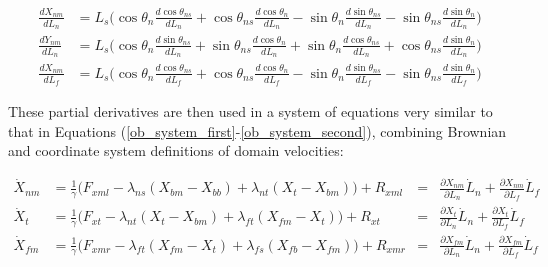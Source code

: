 \documentclass[
11pt, %
english, %
singlespacing, %
headsepline, %
chapterinoneline, %
]{MastersDoctoralThesis} %
\begin{document}
\begin{align}
  \frac{dX_{nm}}{dL_n} &= L_s\Big(\cos\theta_n\frac{d\cos\theta_{ns}}{dL_n} + \cos\theta_{ns}\frac{d\cos\theta_{n}}{dL_n} - \sin\theta_n\frac{d\sin\theta_{ns}}{dL_n} - \sin\theta_{ns}\frac{d\sin\theta_{n}}{dL_n}\Big)\\
  \frac{dY_{nm}}{dL_n} &= L_s\Big(\cos\theta_n\frac{d\sin\theta_{ns}}{dL_n} + \sin\theta_{ns}\frac{d\cos\theta_{n}}{dL_n} + \sin\theta_n\frac{d\cos\theta_{ns}}{dL_n} + \cos\theta_{ns}\frac{d\sin\theta_{n}}{dL_n} \Big)\\
  \frac{dX_{nm}}{dL_f} &= L_s\Big(\cos\theta_n\frac{d\cos\theta_{ns}}{dL_f} + \cos\theta_{ns}\frac{d\cos\theta_{n}}{dL_f} - \sin\theta_n\frac{d\sin\theta_{ns}}{dL_f} - \sin\theta_{ns}\frac{d\sin\theta_{n}}{dL_f} \Big)
\end{align}

These partial derivatives are then used in a system of equations very similar to that in Equations (\ref{ob_system_first}-\ref{ob_system_second}), combining Brownian and coordinate system definitions of domain velocities:

\begin{align}
  \dot{X}_{nm} &= \frac{1}{\gamma} \Big(F_{xml} - \lambda_{ns}(X_{bm} - X_{bb})
  + \lambda_{nt}(X_{t } - X_{bm}) \Big) + R_{xml}
  &=& \frac{\partial X_{nm}}{\partial L_n}\dot{L}_n + \frac{\partial X_{nm}}{\partial L_f}\dot{L}_f\\
  \dot{X}_{t } &= \frac{1}{\gamma} \Big(F_{xt } - \lambda_{nt}(X_{t } - X_{bm})
  + \lambda_{ft}(X_{fm} - X_{t }) \Big) + R_{xt }
  &=& \frac{\partial X_{t}}{\partial L_n}\dot{L}_n + \frac{\partial X_{t}}{\partial L_f}\dot{L}_f\\
  \dot{X}_{fm} &= \frac{1}{\gamma} \Big(F_{xmr} - \lambda_{ft}(X_{fm} - X_{t })
  + \lambda_{fs}(X_{fb} - X_{fm}) \Big) + R_{xmr}
  &=& \frac{\partial X_{fm}}{\partial L_n}\dot{L}_n + \frac{\partial X_{fm}}{\partial L_f}\dot{L}_f
\end{align}
\end{document}
